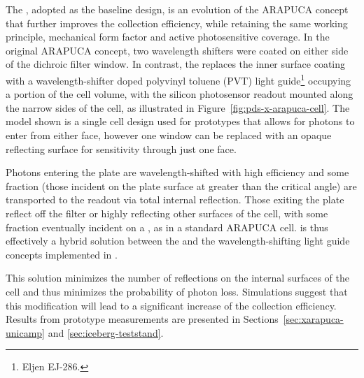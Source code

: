 
The , adopted as the baseline design, is an evolution of the ARAPUCA concept that further improves the collection efficiency, while retaining the same working principle, mechanical form factor and active photosensitive coverage. 
 In the original ARAPUCA concept, two wavelength shifters were coated on either side of the dichroic filter window. 
 In contrast, the  replaces the inner surface coating with a wavelength-shifter doped polyvinyl toluene (PVT)  light guide\footnote{Eljen EJ-286\texttrademark{}.} occupying a portion of the cell volume, with the silicon photosensor readout mounted along the narrow sides of the cell, as illustrated in Figure~\ref{fig:pds-x-arapuca-cell}. The model shown is a single cell design used for prototypes that allows for photons to enter from either face, however one window can be replaced with an opaque reflecting surface for sensitivity through just one face.

Photons entering the plate are wavelength-shifted with high efficiency and some fraction (those incident on the plate surface at greater than the critical angle) are transported to the readout via total internal reflection. Those exiting the plate reflect off the filter or highly reflecting other surfaces of the cell, with some fraction eventually incident on a , as in a standard ARAPUCA cell.
 is thus effectively a hybrid solution between the  and the wavelength-shifting light guide concepts implemented in .



This solution minimizes the number of reflections on the internal surfaces of the cell and thus minimizes the probability of photon loss. Simulations suggest that this modification will lead to a significant increase of the collection efficiency. 
Results from prototype measurements are presented in Sections~\ref{sec:xarapuca-unicamp} and \ref{sec:iceberg-teststand}.

